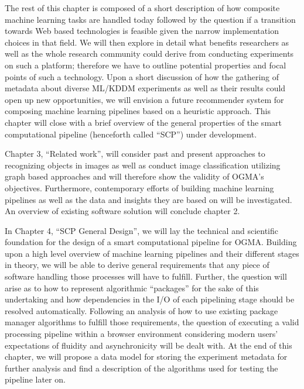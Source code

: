 The rest of this chapter is composed of a short description of how composite machine learning tasks are handled today followed by the question if a transition towards Web based technologies is feasible given the narrow implementation choices in that field. We will then explore in detail what benefits researchers as well as the whole research community could derive from conducting experiments on such a platform; therefore we have to outline potential properties and focal points of such a technology. Upon a short discussion of how the gathering of metadata about diverse ML/KDDM experiments as well as their results could open up new opportunities, we will envision a future recommender system for composing machine learning pipelines based on a heuristic approach. This chapter will close with a brief overview of the general properties of the smart computational pipeline (henceforth called ``SCP'') under development.

\par

Chapter 3, ``Related work'', will consider past and present approaches to recognizing objects in images as well as conduct image classification utilizing graph based approaches and will therefore show the validity of OGMA's objectives. Furthermore, contemporary efforts of building machine learning pipelines as well as the data and insights they are based on will be investigated. An overview of existing software solution will conclude chapter 2.

\par

In Chapter 4, ``SCP General Design'', we will lay the technical and scientific foundation for the design of a smart computational pipeline for OGMA. Building upon a high level overview of machine learning pipelines and their different stages in theory, we will be able to derive general requirements that any piece of software handling those processes will have to fulfill. Further, the question will arise as to how to represent algorithmic ``packages'' for the sake of this undertaking and how dependencies in the I/O of each pipelining stage should be resolved automatically. Following an analysis of how to use existing package manager algorithms to fulfill those requirements, the question of executing a valid processing pipeline within a browser environment considering modern users' expectations of fluidity and asynchronicity will be dealt with. At the end of this chapter, we will propose a data model for storing the experiment metadata for further analysis and find a description of the algorithms used for testing the pipeline later on.

